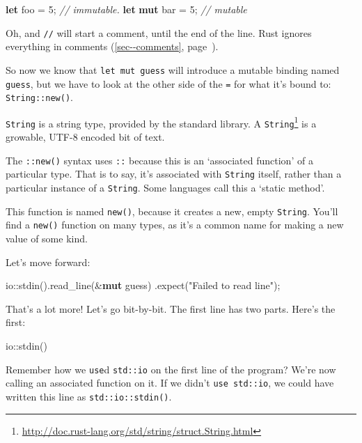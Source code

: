 \documentclass[a4paper,]{book}
\renewcommand*{\hyperlink}[2]{%
 #2 (\autoref{#1}, page~\pageref{#1})}
\newenvironment{Shaded}{\begin{snugshade}}{\end{snugshade}}
\newcommand{\KeywordTok}[1]{\textcolor[rgb]{0.13,0.29,0.53}{\textbf{{#1}}}}
\newcommand{\DecValTok}[1]{\textcolor[rgb]{0.00,0.00,0.81}{{#1}}}
\newcommand{\StringTok}[1]{\textcolor[rgb]{0.31,0.60,0.02}{{#1}}}
\newcommand{\CommentTok}[1]{\textcolor[rgb]{0.56,0.35,0.01}{\textit{{#1}}}}
\newcommand{\NormalTok}[1]{{#1}}
\renewcommand{\href}[2]{#2\footnote{\url{#1}}}
\begin{document}
\begin{Shaded}
\begin{Highlighting}[]
\KeywordTok{let} \NormalTok{foo = }\DecValTok{5}\NormalTok{; }\CommentTok{// immutable.}
\KeywordTok{let} \KeywordTok{mut} \NormalTok{bar = }\DecValTok{5}\NormalTok{; }\CommentTok{// mutable}
\end{Highlighting}
\end{Shaded}

Oh, and \texttt{//} will start a comment, until the end of the line.
Rust ignores everything in \protect\hyperlink{sec--comments}{comments}.

So now we know that \texttt{let\ mut\ guess} will introduce a mutable
binding named \texttt{guess}, but we have to look at the other side of
the \texttt{=} for what it's bound to: \texttt{String::new()}.

\texttt{String} is a string type, provided by the standard library. A
\href{http://doc.rust-lang.org/std/string/struct.String.html}{\texttt{String}}
is a growable, UTF-8 encoded bit of text.

The \texttt{::new()} syntax uses \texttt{::} because this is an
`associated function' of a particular type. That is to say, it's
associated with \texttt{String} itself, rather than a particular
instance of a \texttt{String}. Some languages call this a `static
method'.

This function is named \texttt{new()}, because it creates a new, empty
\texttt{String}. You'll find a \texttt{new()} function on many types, as
it's a common name for making a new value of some kind.

Let's move forward:

\begin{Shaded}
\begin{Highlighting}[]
    \NormalTok{io::stdin().read_line(&}\KeywordTok{mut} \NormalTok{guess)}
        \NormalTok{.expect(}\StringTok{"Failed to read line"}\NormalTok{);}
\end{Highlighting}
\end{Shaded}

That's a lot more! Let's go bit-by-bit. The first line has two parts.
Here's the first:

\begin{Shaded}
\begin{Highlighting}[]
\NormalTok{io::stdin()}
\end{Highlighting}
\end{Shaded}

Remember how we \texttt{use}d \texttt{std::io} on the first line of the
program? We're now calling an associated function on it. If we didn't
\texttt{use\ std::io}, we could have written this line as
\texttt{std::io::stdin()}.
\end{document}
